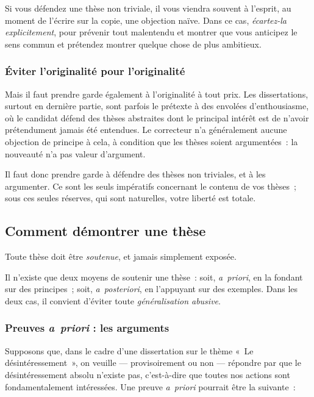 \documentclass[a4paper,12pt]{article}
\begin{document}
Si vous défendez une thèse non triviale, il vous viendra souvent à
l'esprit, au moment de l'écrire sur la copie, une objection naïve. Dans
ce cas, \emph{écartez-la explicitement}, pour prévenir tout malentendu et
montrer que vous anticipez le sens commun et prétendez montrer quelque
chose de plus ambitieux.

\subsubsection{Éviter l'originalité pour l'originalité}
\label{sec-3-2-4}

Mais il faut prendre garde également à l'originalité à tout prix. Les
dissertations, surtout en dernière partie, sont parfois le prétexte à
des envolées d'enthousiasme, où le candidat défend des thèses abstraites
dont le principal intérêt est de n'avoir prétendument jamais été
entendues. Le correcteur n'a généralement aucune objection de principe à
cela, à condition que les thèses soient argumentées : la nouveauté n'a
pas valeur d'argument.

Il faut donc prendre garde à défendre des thèses non triviales, et à les
argumenter. Ce sont les seuls impératifs concernant le contenu de vos
thèses ; sous ces seules réserves, qui sont naturelles, votre liberté
est totale.

\subsection{Comment démontrer une thèse}
\label{sec-3-3}

Toute thèse doit être \emph{soutenue}, et jamais simplement exposée.

Il n'existe que deux moyens de soutenir une thèse : soit, \emph{a priori}, en
la fondant sur des principes ; soit, \emph{a posteriori}, en l'appuyant sur
des exemples. Dans les deux cas, il convient d'éviter toute
\emph{généralisation abusive}.

\subsubsection{Preuves \emph{a priori} : les arguments}
\label{sec-3-3-1}

Supposons que, dans le cadre d'une dissertation sur le thème « Le
désintéressement », on veuille --- provisoirement ou non --- répondre par
que le désintéressement absolu n'existe pas, c'est-à-dire que toutes nos
actions sont fondamentalement intéressées. Une preuve \emph{a priori}
pourrait être la suivante :
\end{document}
